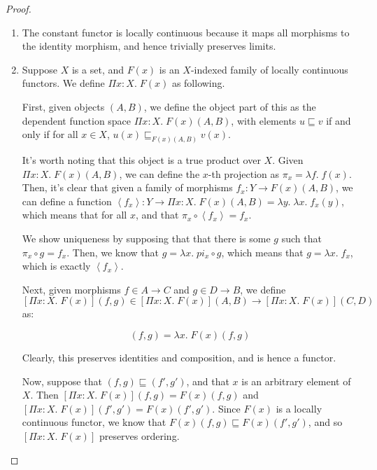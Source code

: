 \begin{proof}
\begin{enumerate}



% 
% 
% 





\item The constant functor is locally continuous because it maps all 
morphisms to the identity morphism, and hence trivially preserves 
limits. 

\item Suppose $X$ is a set, and $F(x)$ is an $X$-indexed family of
locally continuous functors. We define $\Pi x:X.\; F(x)$ as
following. 

First, given objects $(A,B)$, we define the object part of this as the
dependent function space $\Pi x:X.\; F(x)(A,B)$, with elements $u
\sqsubseteq v$ if and only if for all $x \in X$, $u(x)
\sqsubseteq_{F(x)(A,B)} v(x)$. 

It's worth noting that this object is a true product over $X$. Given
$\Pi x:X.\; F(x)(A,B)$, we can define the $x$-th projection as $\pi_x
= \lambda f.\; f(x)$. Then, it's clear that given a family of 
morphisms $f_x : Y \to F(x)(A,B)$, we can define a function 
$\left<f_x\right> : Y \to \Pi x:X.\;F(x)(A,B) = \lambda y.\; \lambda x.\; f_x(y)$, 
which means that for all $x$, and that $\pi_x \circ \left<f_x\right> = f_x$. 

We show uniqueness by supposing that that there is some $g$ such
that $\pi_x \circ g = f_x$. Then, we know that 
$g = \lambda x.\; pi_x \circ g$, which means that $g = \lambda x.\; f_x$,
which is exactly $\left<f_x\right>$. 


Next, given morphisms $f \in A \to C$ and $g \in D \to B$, we define
$[\Pi x:X.\; F(x)](f,g) \in [\Pi x:X.\; F(x)](A,B) \to [\Pi x:X.\; F(x)](C,D)$
as:
  
\begin{displaymath}
  [\Pi x:X.\; F(x)](f,g) = \lambda x.\; F(x)(f,g)
\end{displaymath}

Clearly, this preserves identities and composition, and is hence a
functor. 

Now, suppose that $(f,g) \sqsubseteq (f',g')$, and that $x$ is an
arbitrary element of $X$. Then $[\Pi x:X.\; F(x)](f,g) = F(x)(f,g)$
and $[\Pi x:X.\; F(x)](f',g') = F(x)(f',g')$. Since $F(x)$ is a
locally continuous functor, we know that $F(x)(f,g) \sqsubseteq
F(x)(f',g')$, and so $[\Pi x:X.\; F(x)]$ preserves ordering.


\end{enumerate}
\end{proof}
